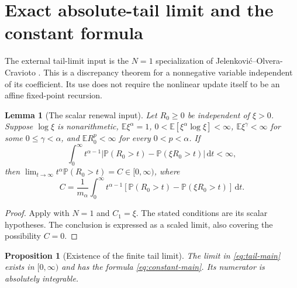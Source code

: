 \documentclass[11pt,a4paper]{article}
\numberwithin{equation}{section}
\newtheorem{lemma}[theorem]{Lemma}
\newtheorem{proposition}[theorem]{Proposition}
\theoremstyle{remark}
\newcommand{\E}{\mathbb E}
\newcommand{\Pp}{\mathbb P}
\newcommand{\dd}{\,\mathrm d}
\newcommand{\bigabs}[1]{\left|#1\right|}
\begin{document}
\section{Exact absolute-tail limit and the constant formula}\label{sec:renewal}

The external tail-limit input is the $N=1$ specialization of
Jelenkovi\'c--Olvera-Cravioto \cite[Theorem 3.1, printed p.~5]{JO2012Thm31}.
This is a discrepancy theorem for a nonnegative variable independent of
its coefficient. Its use does not require the nonlinear update itself
to be an affine fixed-point recursion.

\begin{lemma}[The scalar renewal input]\label{lem:renewal-input}
Let $R_0\ge0$ be independent of $\xi>0$. Suppose $\log\xi$ is
nonarithmetic, $\E\xi^\alpha=1$,
$0<\E[\xi^\alpha\log\xi]<\infty$, $\E\xi^\gamma<\infty$ for some
$0\le\gamma<\alpha$, and $\E R_0^p<\infty$ for every $0<p<\alpha$.
If
\begin{equation}
 \int_0^\infty t^{\alpha-1}
  \bigabs{\Pp(R_0>t)-\Pp(\xi R_0>t)}\dd t<\infty,
 \label{eq:renewal-condition}
\end{equation}
then $\lim_{t\to\infty}t^\alpha\Pp(R_0>t)=C\in[0,\infty)$, where
\begin{equation}
 C=\frac1{m_\alpha}\int_0^\infty t^{\alpha-1}
       [\Pp(R_0>t)-\Pp(\xi R_0>t)]\dd t.
 \label{eq:renewal-constant}
\end{equation}
\end{lemma}

\begin{proof}
Apply \cite[Theorem 3.1]{JO2012Thm31} with $N=1$ and $C_1=\xi$.
The stated conditions are its scalar hypotheses. The conclusion is
expressed as a scaled limit, also covering the possibility $C=0$.
\end{proof}

\begin{proposition}[Existence of the finite tail limit]\label{prop:tail-exists}
The limit in \eqref{eq:tail-main} exists in $[0,\infty)$ and has the
formula \eqref{eq:constant-main}. Its numerator is absolutely integrable.
\end{proposition}
\end{document}
